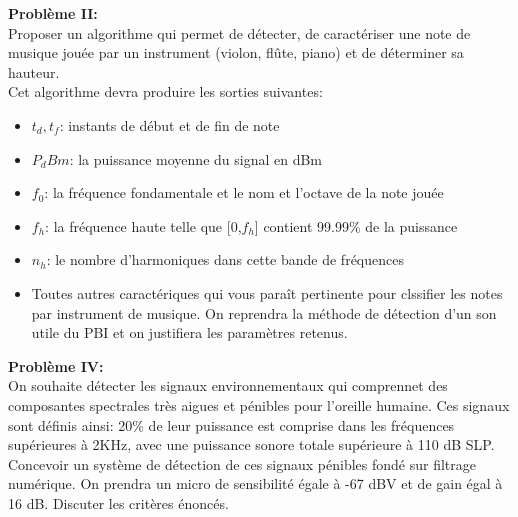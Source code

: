 \textbf{Problème II:} \  \\
Proposer un algorithme qui permet de détecter, de caractériser une note de musique jouée par un instrument (violon, flûte, piano) et de déterminer sa hauteur. \\
Cet algorithme devra produire les sorties suivantes: \\
\begin{itemize}
    \item $t_d, t_f$: instants de début et de fin de note
    \item $P_dBm$: la puissance moyenne du signal en dBm
    \item $f_0$: la fréquence fondamentale et le nom et l'octave de la note jouée
    \item $f_h$: la fréquence haute telle que [0,$f_h$] contient 99.99\% de la puissance
    \item $n_h$: le nombre d'harmoniques dans cette bande de fréquences
    \item Toutes autres caractériques qui vous  paraît pertinente pour clssifier les notes par instrument de musique.
    On reprendra la méthode de détection d'un son utile du PBI et on justifiera les paramètres retenus.
\end{itemize}
\textbf{Problème IV:} \ \\
On souhaite détecter les signaux environnementaux qui comprennet des composantes spectrales très aigues et pénibles pour l'oreille humaine. Ces signaux sont définis ainsi: 20\% de leur puissance est comprise dans les fréquences supérieures à 2KHz, avec une puissance sonore totale supérieure à 110 dB SLP. \\
Concevoir un système de détection de ces signaux pénibles fondé sur filtrage
numérique. On prendra un micro de sensibilité égale à -67 dBV et de gain égal à 16 dB. Discuter les critères énoncés.

  
